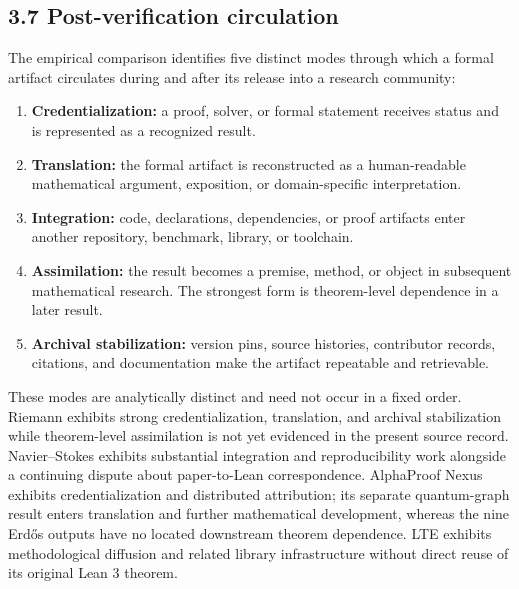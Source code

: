 \documentclass[sn-apa]{sn-jnl}
\begin{document}
\subsection{3.7 Post-verification circulation}

The empirical comparison identifies five distinct modes through which a formal artifact circulates during and after its release into a research community:

\begin{enumerate}

\item \textbf{Credentialization:} a proof, solver, or formal statement receives status and is represented as a recognized result.

\item \textbf{Translation:} the formal artifact is reconstructed as a human-readable mathematical argument, exposition, or domain-specific interpretation.

\item \textbf{Integration:} code, declarations, dependencies, or proof artifacts enter another repository, benchmark, library, or toolchain.

\item \textbf{Assimilation:} the result becomes a premise, method, or object in subsequent mathematical research. The strongest form is theorem-level dependence in a later result.

\item \textbf{Archival stabilization:} version pins, source histories, contributor records, citations, and documentation make the artifact repeatable and retrievable.

\end{enumerate}

These modes are analytically distinct and need not occur in a fixed order. Riemann exhibits strong credentialization, translation, and archival stabilization while theorem-level assimilation is not yet evidenced in the present source record. Navier–Stokes exhibits substantial integration and reproducibility work alongside a continuing dispute about paper-to-Lean correspondence. AlphaProof Nexus exhibits credentialization and distributed attribution; its separate quantum-graph result enters translation and further mathematical development, whereas the nine Erdős outputs have no located downstream theorem dependence. LTE exhibits methodological diffusion and related library infrastructure without direct reuse of its original Lean 3 theorem.
\end{document}
